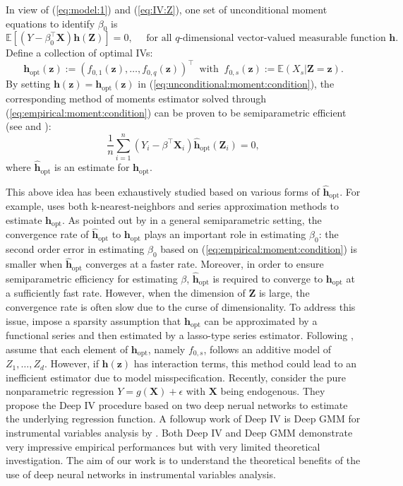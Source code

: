 \documentclass[11pt, preprint]{imsart}
\numberwithin{equation}{section}
\def \bfX{\mathbf{X}}
\def \bfZ{\mathbf{Z}}
\def \bfz{\mathbf{z}}
\def \bfh{\mathbf{h}}
\def \ev{\mathbb{E}}
\theoremstyle{plain}
\theoremstyle{definition}
\begin{document}
In view of (\ref{eq:model:1}) and (\ref{eq:IV:Z}), one set of unconditional moment equations to identify $\beta_0$ is
\begin{equation}\label{eq:unconditional:moment:condition}
	\ev[(Y-\beta_0^\top\bfX)\bfh(\bfZ)]=0,\quad \textrm{ for all $q$-dimensional vector-valued measurable function } \bfh.
\end{equation}
Define a collection of optimal IVs: $$\bfh_{\textrm{opt}}(\bfz):=(f_{0,1}(\bfz),\ldots, f_{0,q}(\bfz))^\top\;\;\mbox{with}\;\;f_{0,s}(\bfz):=\ev(X_{s} | \bfZ=\bfz).$$ By setting $\bfh(\bfz)=\bfh_{\textrm{opt}}(\bfz)$ in (\ref{eq:unconditional:moment:condition}), the corresponding method of moments estimator solved through (\ref{eq:empirical:moment:condition}) can be proven to be semiparametric efficient (see \citealp{a74} and \citealp{n90}):
\begin{equation}\label{eq:empirical:moment:condition}
	\frac{1}{n}\sum_{i=1}^n (Y_i-\beta^\top\bfX_i)\widehat{\bfh}_{\textrm{opt}}(\bfZ_i)=0,
\end{equation}
where $\widehat{\bfh}_{\textrm{opt}}$ is an estimate for ${\bfh}_{\textrm{opt}}$. 

This above idea has been exhaustively studied based on various forms of $\widehat{\bfh}_{\textrm{opt}}$. For example, \cite{n90}  uses both k-nearest-neighbors and series approximation methods to estimate ${\bfh}_{\textrm{opt}}$. {As pointed out by \cite{cheng2008general} in a general semiparametric setting, the convergence rate of  $\widehat{\bfh}_{\textrm{opt}}$ to ${\bfh}_{\textrm{opt}}$ plays an important role in estimating $\beta_0$: the second order error in estimating $\beta_0$ based on (\ref{eq:empirical:moment:condition}) is smaller when $\widehat{\bfh}_{\textrm{opt}}$ converges at a faster rate.} Moreover, in order to ensure semiparametric efficiency for estimating $\beta$, $\widehat{\bfh}_{\textrm{opt}}$ is required to converge to $\bfh_{\textrm{opt}}$ at a sufficiently fast rate. However, when the dimension of $\bfZ$ is large, the convergence rate is often slow due to the curse of dimensionality. To address this issue, \cite{bcch12} impose a sparsity assumption that ${\bfh}_{\textrm{opt}}$ can be approximated by a functional series and then estimated by a lasso-type series estimator. Following \cite{bcch12}, \cite{fz18} assume that each element of $\bfh_{\textrm{opt}}$, namely $f_{0,s}$, follows an additive model of $Z_1,\ldots, Z_d$. However, if $\bfh(\bfz)$ has interaction terms, this method could lead to an inefficient estimator due to model misspecification. Recently, \cite{hllt17} consider the pure nonparametric regression $Y=g(\bfX)+\epsilon$ with $\bfX$ being endogenous. They propose the Deep IV procedure based on two deep nerual networks to estimate the underlying regression function. A followup work of Deep IV is Deep GMM for instrumental variables analysis by \cite{bennett2019deep}. Both Deep IV and Deep GMM demonstrate very impressive empirical performances but with very limited theoretical investigation. The aim of our work is to understand the theoretical benefits of the use of deep neural networks in instrumental variables analysis.
\end{document}
